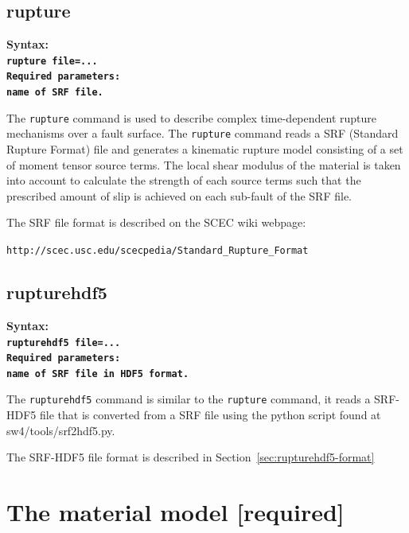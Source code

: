 \documentclass[11pt]{report}
\begin{document}
\subsection{rupture}
\label{keyword:rupture}
\begin{flushleft}
\bf
Syntax:\\ \tt rupture file=...\\ 
\bf
Required parameters:\\ \rm name of SRF file.
\end{flushleft}
The \verb+rupture+ command is used to describe complex time-dependent rupture mechanisms over a
fault surface. The \verb+rupture+ command reads a SRF (Standard Rupture Format) file and generates a
kinematic rupture model consisting of a set of moment tensor source terms. The local shear modulus
of the material is taken into account to calculate the strength of each source terms such that the
prescribed amount of slip is achieved on each sub-fault of the SRF file. 

The SRF file format is described on the SCEC wiki webpage:

\verb+http://scec.usc.edu/scecpedia/Standard_Rupture_Format+


\subsection{rupturehdf5}
\label{keyword:rupturehdf5}
\begin{flushleft}
\bf
Syntax:\\ \tt rupturehdf5 file=...\\ 
\bf
Required parameters:\\ \rm name of SRF file in HDF5 format.
\end{flushleft}
The \verb+rupturehdf5+ command is similar to the \verb+rupture+ command, it reads a SRF-HDF5 file that is
converted from a SRF file using the python script found at sw4/tools/srf2hdf5.py.

The SRF-HDF5 file format is described in Section~\ref{sec:rupturehdf5-format}


\section{The material model [required]} 
\end{document}
